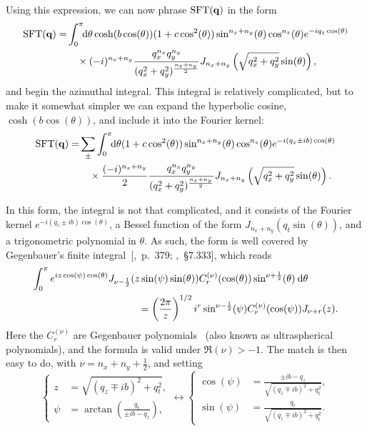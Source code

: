 Using this expression, we can now phrase $\mathrm{SFT}(\vb{q})$ in the form
\begin{align}
\mathrm{SFT}(\vb{q})
=
&
\int_0^\pi\!\!\mathrm{d}\theta
\cosh(b\cos(\theta)) (1+c\cos^2(\theta))  
\sin^{n_x+n_y}(\theta)  \cos^{n_z}(\theta)
e^{-i q_z\cos(\theta) }
\nonumber \\ & \quad \times 
(-i)^{n_x+n_y}
\frac{ q_x^{n_x} q_y^{n_{\smash[b]{y}}}  }{(q_x^2+q_y^2)^\frac{n_x+n_y}{2}}
J_{n_x+n_y}\left(\sqrt{q_x^2+q_y^2}\sin(\theta)\right)
,
\label{e2-sft-with-longitudinal-bessels}
\end{align}
and begin the azimuthal integral. This integral is relatively complicated, but to make it somewhat simpler we can expand the hyperbolic cosine, $\cosh(b\cos(\theta))$, and include it into the Fourier kernel:
\begin{align}
\mathrm{SFT}(\vb{q})
=
&
\sum_\pm
\int_0^\pi\!\!\mathrm{d}\theta
(1+c\cos^2(\theta))  
\sin^{n_x+n_y}(\theta)  \cos^{n_z}(\theta)
e^{-i (q_z \pm i b)\cos(\theta) }
\nonumber \\ & \quad \times 
\frac{(-i)^{n_x+n_y}}{2}
\frac{ q_x^{n_x} q_y^{n_{\smash[b]{y}}}  }{(q_x^2+q_y^2)^\frac{n_x+n_y}{2}}
J_{n_x+n_y}\left(\sqrt{q_x^2+q_y^2}\sin(\theta)\right)
.
\label{e2-sft-with-cosh-substitution}
\end{align}


In this form, the integral is not that complicated, and it consists of the Fourier kernel $e^{-i (q_z \pm i b)\cos(\theta) }$, a Bessel function of the form $J_{n_x+n_y}\left(q_t \sin(\theta)\right)$, and a trigonometric polynomial in $\theta$. As such, the form is well covered by Gegenbauer's finite integral~[\citealp{watson_bessel_functions},~p.~379; \citealp{gradshteyn_ryzhik},~\S7.333], which reads
\begin{align}
\int_0^\pi
e^{iz\cos(\psi)\cos(\theta)}
&  
J_{\nu-\frac12}(z\sin(\psi)\sin(\theta))
C_r^{(\nu)}(\cos(\theta))
\sin^{\nu+\frac12}(\theta)
\:\mathrm{d}\theta
\nonumber \\ & \qquad \quad  =
\left(\frac{2\pi}{z}\right)^{1/2}
i^r
\sin^{\nu-\frac12}(\psi)
C_r^{(\nu)}(\cos(\psi))
J_{\nu+r}(z)
.
\label{e2-gegenbauer-integral}
\end{align}
Here the $C_r^{(\nu)}$ are Gegenbauer polynomials~ (also known as ultraspherical polynomials), and the formula is valid under $\Re(\nu)>-1$. The match is then easy to do, with $\nu=n_x+n_y+\frac12$, and setting
\begin{equation}
\left\{\begin{aligned}
z&=\sqrt{(q_z \mp ib)^2 +q_t^2}, \\
\psi&=\arctan\left(\frac{q_t}{\pm i b-q_z}\right),
\end{aligned}\right.
\longleftrightarrow
\left\{\begin{aligned}
\cos(\psi)&=\frac{\pm i b-q_z}{\sqrt{(q_z \mp ib)^2 +q_t^2}}, \\
\sin(\psi)&=\frac{q_t}{\sqrt{(q_z \mp ib)^2 +q_t^2}}.
\end{aligned}\right.
\end{equation}

